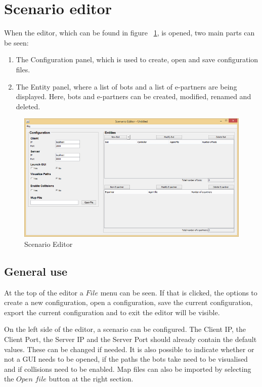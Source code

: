 \section{Scenario editor}
When the editor, which can be found in figure ~\ref{fig:editor}, is opened, two main parts can be seen:
\begin{enumerate}
\item The Configuration panel, which is used to create, open and save configuration files.
\item The Entity panel, where a list of bots and a list of e-partners are being displayed. Here, bots and e-partners can be created, modified, renamed and deleted.
\end{enumerate}

\begin{figure}[h]
\begin{center}
\includegraphics{NewFeatures/editor.png}
\caption{Scenario Editor}
\label{fig:editor}
\end{center}
\end{figure}

\subsection{General use}
At the top of the editor a $File$ menu can be seen. If that is clicked, the options to create a new configuration, open a configuration, save the current configuration, export the current configuration and to exit the editor will be visible.

On the left side of the editor, a scenario can be configured. The Client IP, the Client Port, the Server IP and the Server Port should already contain the default values. These can be changed if needed. It is also possible to indicate whether or not a GUI needs to be opened, if the paths the bots take need to be visualised and if collisions need to be enabled. Map files can also be imported by selecting the $Open$ $file$ button at the right section.

